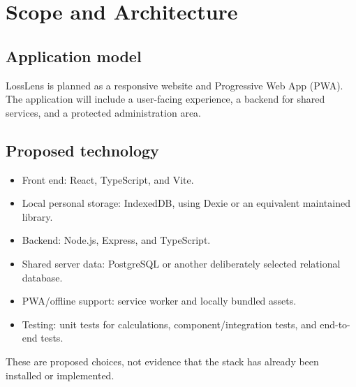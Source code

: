 \documentclass[11pt,a4paper]{article}
\begin{document}
\section{Scope and Architecture}

\subsection{Application model}
LossLens is planned as a responsive website and Progressive Web App (PWA). The application will include a user-facing experience, a backend for shared services, and a protected administration area.

\subsection{Proposed technology}
\begin{itemize}
  \item Front end: React, TypeScript, and Vite.
  \item Local personal storage: IndexedDB, using Dexie or an equivalent maintained library.
  \item Backend: Node.js, Express, and TypeScript.
  \item Shared server data: PostgreSQL or another deliberately selected relational database.
  \item PWA/offline support: service worker and locally bundled assets.
  \item Testing: unit tests for calculations, component/integration tests, and end-to-end tests.
\end{itemize}
These are proposed choices, not evidence that the stack has already been installed or implemented.
\end{document}
